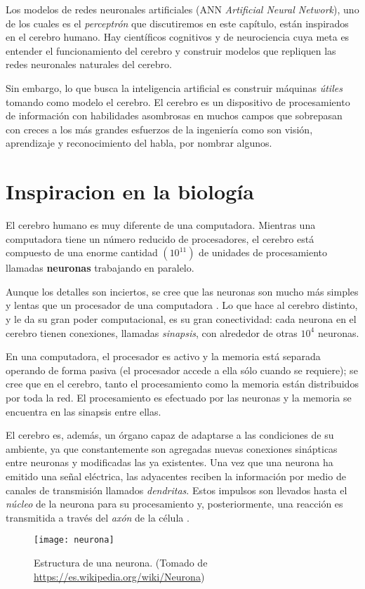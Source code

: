 Los modelos de redes neuronales artificiales (ANN \textit{Artificial
Neural Network}), uno de los cuales es el
\textit{perceptrón} que discutiremos en este capítulo, están
inspirados en el cerebro humano. Hay científicos cognitivos y de
neurociencia cuya meta es entender el funcionamiento del cerebro y
construir modelos que repliquen las redes neuronales naturales del
cerebro.

Sin embargo, lo que busca la inteligencia artificial es construir
máquinas \textit{útiles} tomando como modelo el cerebro. El cerebro es
un dispositivo de procesamiento de información con habilidades
asombrosas en muchos campos que sobrepasan con creces a los más
grandes esfuerzos de la ingeniería como son visión, aprendizaje y
reconocimiento del habla, por nombrar algunos.

\section{Inspiracion en la biología}
El cerebro humano es muy diferente de una computadora. Mientras una
computadora tiene un número reducido de procesadores, el cerebro está
compuesto de una enorme cantidad $(10^{11})$ de unidades de
procesamiento llamadas \textbf{neuronas} trabajando en paralelo.

Aunque los detalles son inciertos, se cree que las neuronas son mucho
más simples y lentas que un procesador de una computadora
\cite{ethem}. Lo que hace al cerebro distinto, y le da su gran poder
computacional, es su gran conectividad: cada neurona en el cerebro
tienen conexiones, llamadas \textit{sinapsis}, con alrededor de otras
$10^{4}$ neuronas.

En una computadora, el procesador es activo y la memoria está separada
operando de forma pasiva (el procesador accede a ella sólo cuando se
requiere); se cree que en el cerebro, tanto el procesamiento como la
memoria están distribuidos por toda la red. El procesamiento es
efectuado por las neuronas y la memoria se encuentra en las sinapsis
entre ellas.

El cerebro es, además, un órgano capaz de adaptarse a las condiciones
de su ambiente, ya que constantemente son agregadas nuevas conexiones
sinápticas entre neuronas y modificadas las ya existentes. Una vez que
una neurona ha emitido una señal eléctrica, las adyacentes reciben la
información por medio de canales de transmisión llamados
\textit{dendritas}. Estos impulsos son llevados hasta el
\textit{núcleo} de la neurona para su procesamiento y, posteriormente,
una reacción es transmitida a través del \textit{axón} de la célula
\cite{memes}.
\begin{figure}[h]
  \texttt{[image: neurona]} \centering
  \caption{Estructura de una neurona. (Tomado de
    \url{https://es.wikipedia.org/wiki/Neurona})}
\end{figure}

